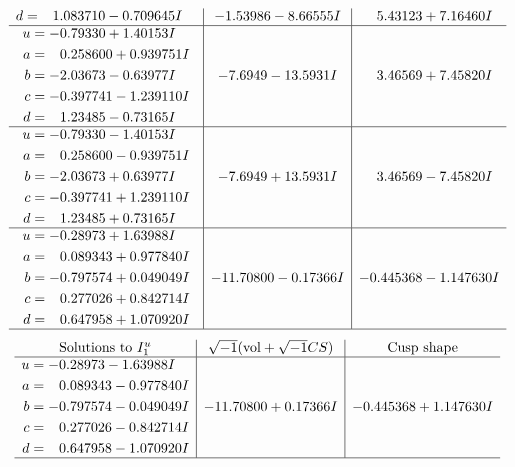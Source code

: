 \documentclass[1p]{elsarticle_modified}
\theoremstyle{definition}
\newcommand{\I}{\sqrt{-1}}
\begin{document}
$$\begin{array}{c|c|c}
\begin{aligned}
d &= \phantom{-}1.083710 - 0.709645 I\end{aligned}
 & -1.53986 - 8.66555 I & \phantom{-}5.43123 + 7.16460 I \\ \hline\begin{aligned}
u &= -0.79330 + 1.40153 I \\
a &= \phantom{-}0.258600 + 0.939751 I \\
b &= -2.03673 - 0.63977 I \\
c &= -0.397741 - 1.239110 I \\
d &= \phantom{-}1.23485 - 0.73165 I\end{aligned}
 & -7.6949 - 13.5931 I & \phantom{-}3.46569 + 7.45820 I \\ \hline\begin{aligned}
u &= -0.79330 - 1.40153 I \\
a &= \phantom{-}0.258600 - 0.939751 I \\
b &= -2.03673 + 0.63977 I \\
c &= -0.397741 + 1.239110 I \\
d &= \phantom{-}1.23485 + 0.73165 I\end{aligned}
 & -7.6949 + 13.5931 I & \phantom{-}3.46569 - 7.45820 I \\ \hline\begin{aligned}
u &= -0.28973 + 1.63988 I \\
a &= \phantom{-}0.089343 + 0.977840 I \\
b &= -0.797574 + 0.049049 I \\
c &= \phantom{-}0.277026 + 0.842714 I \\
d &= \phantom{-}0.647958 + 1.070920 I\end{aligned}
 & -11.70800 - 0.17366 I & -0.445368 - 1.147630 I\\
 \hline 
 \end{array}$$\newpage$$\begin{array}{c|c|c}  
\text{Solutions to }I^u_{1}& \I (\text{vol} + \sqrt{-1}CS) & \text{Cusp shape}\\
 \hline 
\begin{aligned}
u &= -0.28973 - 1.63988 I \\
a &= \phantom{-}0.089343 - 0.977840 I \\
b &= -0.797574 - 0.049049 I \\
c &= \phantom{-}0.277026 - 0.842714 I \\
d &= \phantom{-}0.647958 - 1.070920 I\end{aligned}
 & -11.70800 + 0.17366 I & -0.445368 + 1.147630 I\\
 \hline 
 \end{array}$$\newpage\newpage\renewcommand{\arraystretch}{1}
\end{document}
